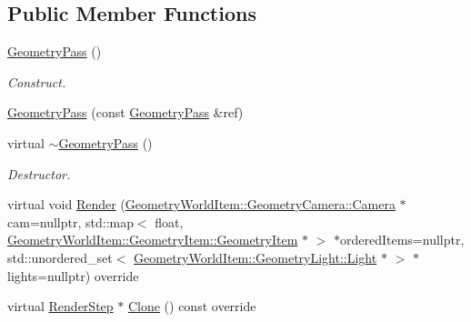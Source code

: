 \subsection*{Public Member Functions}
\begin{DoxyCompactItemize}
\item 
\mbox{\label{class_geometry_engine_1_1_geometry_render_step_1_1_geometry_pass_a304d78be51e786954783551786e83426}} 
\mbox{\hyperlink{class_geometry_engine_1_1_geometry_render_step_1_1_geometry_pass_a304d78be51e786954783551786e83426}{Geometry\+Pass}} ()
\begin{DoxyCompactList}\small\item\em Construct. \end{DoxyCompactList}\item 
\mbox{\hyperlink{class_geometry_engine_1_1_geometry_render_step_1_1_geometry_pass_a4c587bb12a23da23a1617824ccca402d}{Geometry\+Pass}} (const \mbox{\hyperlink{class_geometry_engine_1_1_geometry_render_step_1_1_geometry_pass}{Geometry\+Pass}} \&ref)
\item 
\mbox{\label{class_geometry_engine_1_1_geometry_render_step_1_1_geometry_pass_a5117039655d0d3a34184f65cfbd04c9a}} 
virtual \mbox{\hyperlink{class_geometry_engine_1_1_geometry_render_step_1_1_geometry_pass_a5117039655d0d3a34184f65cfbd04c9a}{$\sim$\+Geometry\+Pass}} ()
\begin{DoxyCompactList}\small\item\em Destructor. \end{DoxyCompactList}\item 
virtual void \mbox{\hyperlink{class_geometry_engine_1_1_geometry_render_step_1_1_geometry_pass_a8c508e9f74abd051a8908bb1a568ea50}{Render}} (\mbox{\hyperlink{class_geometry_engine_1_1_geometry_world_item_1_1_geometry_camera_1_1_camera}{Geometry\+World\+Item\+::\+Geometry\+Camera\+::\+Camera}} $\ast$cam=nullptr, std\+::map$<$ float, \mbox{\hyperlink{class_geometry_engine_1_1_geometry_world_item_1_1_geometry_item_1_1_geometry_item}{Geometry\+World\+Item\+::\+Geometry\+Item\+::\+Geometry\+Item}} $\ast$ $>$ $\ast$ordered\+Items=nullptr, std\+::unordered\+\_\+set$<$ \mbox{\hyperlink{class_geometry_engine_1_1_geometry_world_item_1_1_geometry_light_1_1_light}{Geometry\+World\+Item\+::\+Geometry\+Light\+::\+Light}} $\ast$ $>$ $\ast$lights=nullptr) override
\item 
virtual \mbox{\hyperlink{class_geometry_engine_1_1_geometry_render_step_1_1_render_step}{Render\+Step}} $\ast$ \mbox{\hyperlink{class_geometry_engine_1_1_geometry_render_step_1_1_geometry_pass_a12e85a0169cb7b92cb8bd7b7fe100b33}{Clone}} () const override
\end{DoxyCompactItemize}
